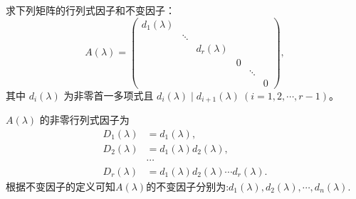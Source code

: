 \documentclass[../../main.tex]{subfiles}
\begin{document}
\begin{proposition}\label{proposition:相抵标准型的行列式因子和不变因子}
求下列矩阵的行列式因子和不变因子：
\[
A(\lambda)=\begin{pmatrix}
d_1(\lambda) & & & & \\
& \ddots & & & \\
& & d_r(\lambda) & & \\
& & & 0 & \\
& & & & \ddots & \\
& & & & & 0
\end{pmatrix},
\]
其中 $d_i(\lambda)$ 为非零首一多项式且 $d_i(\lambda)\mid d_{i + 1}(\lambda)\ (i = 1, 2, \cdots, r - 1)$。
\end{proposition}
\begin{solution}
$A(\lambda)$ 的非零行列式因子为
\begin{align*}
D_1(\lambda)&=d_1(\lambda),\\
D_2(\lambda)&=d_1(\lambda)d_2(\lambda),\\
&\cdots\\
D_r(\lambda)&=d_1(\lambda)d_2(\lambda)\cdots d_r(\lambda).
\end{align*}
根据不变因子的定义可知$A(\lambda)$的不变因子分别为:$d_1(\lambda),d_2(\lambda),\cdots,d_n(\lambda).$
\end{solution}
\end{document}
